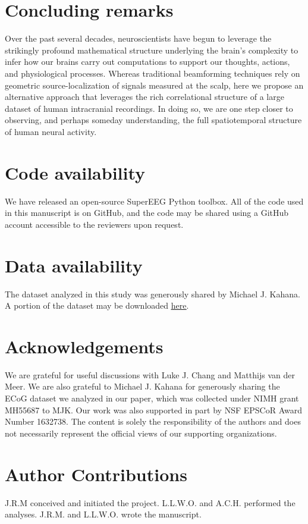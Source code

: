 \documentclass[12pt]{article}
\begin{document}
\section*{Concluding remarks}
Over the past several decades, neuroscientists have begun to leverage
the strikingly profound mathematical structure underlying the brain's
complexity to infer how our brains carry out computations to support
our thoughts, actions, and physiological processes.  Whereas
traditional beamforming techniques rely on geometric
source-localization of signals measured at the scalp, here we propose
an alternative approach that leverages the rich correlational
structure of a large dataset of human intracranial recordings.  In
doing so, we are one step closer to observing, and perhaps
someday understanding, the full spatiotemporal structure of human
neural activity.

\section*{Code availability}
We have released an open-source SuperEEG Python toolbox.  All of the code used in this manuscript is on GitHub, and the code may be shared using a GitHub account accessible to the reviewers upon request.

\section*{Data availability}
The dataset analyzed in this study was generously shared by Michael J. Kahana.  A portion of the dataset may be downloaded \href{http://memory.psych.upenn.edu/Request_EEG_access?paper=SedeEtal03}{\underline{here}}.
\section*{Acknowledgements}
We are grateful for useful discussions with Luke J. Chang and Matthijs van der Meer.  We are also grateful to Michael J. Kahana for generously sharing
the ECoG dataset we analyzed in our paper, which was collected under
NIMH grant MH55687 to MJK.  Our work was also supported in part by NSF EPSCoR Award Number 1632738.  The content is solely the responsibility of the authors and does not necessarily represent the official views of our supporting organizations.
\section*{Author Contributions}
J.R.M conceived and initiated the project. L.L.W.O. and A.C.H. performed the analyses. J.R.M. and L.L.W.O. wrote the manuscript.
\end{document}
